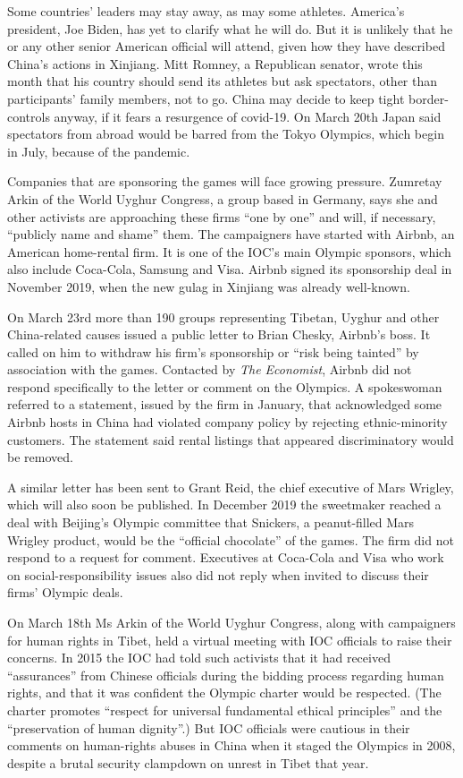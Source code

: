 \documentclass{article}
\begin{document}
Some countries' leaders may stay away, as may some athletes. America's president, Joe Biden, has yet to clarify what he will do. But it is unlikely that he or any other senior American official will attend, given how they have described China's actions in Xinjiang. Mitt Romney, a Republican senator, wrote this month that his country should send its athletes but ask spectators, other than participants' family members, not to go. China may decide to keep tight border-controls anyway, if it fears a resurgence of covid-19. On March 20th Japan said spectators from abroad would be barred from the Tokyo Olympics, which begin in July, because of the pandemic. 

Companies that are sponsoring the games will face growing pressure. Zumretay Arkin of the World Uyghur Congress, a group based in Germany, says she and other activists are approaching these firms ``one by one'' and will, if necessary, ``publicly name and shame'' them. The campaigners have started with Airbnb, an American home-rental firm. It is one of the IOC's main Olympic sponsors, which also include Coca-Cola, Samsung and Visa. Airbnb signed its sponsorship deal in November 2019, when the new gulag in Xinjiang was already well-known. 

On March 23rd more than 190 groups representing Tibetan, Uyghur and other China-related causes issued a public letter to Brian Chesky, Airbnb's boss. It called on him to withdraw his firm's sponsorship or ``risk being tainted'' by association with the games. Contacted by \emph{The Economist}, Airbnb did not respond specifically to the letter or comment on the Olympics. A spokeswoman referred to a statement, issued by the firm in January, that acknowledged some Airbnb hosts in China had violated company policy by rejecting ethnic-minority customers. The statement said rental listings that appeared discriminatory would be removed. 

A similar letter has been sent to Grant Reid, the chief executive of Mars Wrigley, which will also soon be published. In December 2019 the sweetmaker reached a deal with Beijing's Olympic committee that Snickers, a peanut-filled Mars Wrigley product, would be the ``official chocolate'' of the games. The firm did not respond to a request for comment. Executives at Coca-Cola and Visa who work on social-responsibility issues also did not reply when invited to discuss their firms' Olympic deals. 

On March 18th Ms Arkin of the World Uyghur Congress, along with campaigners for human rights in Tibet, held a virtual meeting with IOC officials to raise their concerns. In 2015 the IOC had told such activists that it had received ``assurances'' from Chinese officials during the bidding process regarding human rights, and that it was confident the Olympic charter would be respected. (The charter promotes ``respect for universal fundamental ethical principles'' and the ``preservation of human dignity''.) But IOC officials were cautious in their comments on human-rights abuses in China when it staged the Olympics in 2008, despite a brutal security clampdown on unrest in Tibet that year. 
\end{document}
